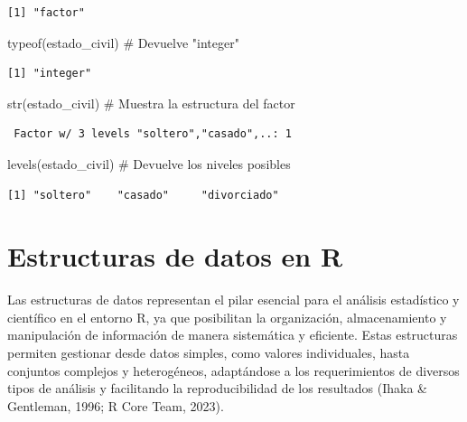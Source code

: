 \documentclass[
  spanish,
  a4paper,
  DIV=11,
  numbers=noendperiod,
  onepage,
  openany]{scrreprt}
\newenvironment{Shaded}{\begin{snugshade}}{\end{snugshade}}
\newcommand{\CommentTok}[1]{\textcolor[rgb]{0.37,0.37,0.37}{#1}}
\newcommand{\FunctionTok}[1]{\textcolor[rgb]{0.28,0.35,0.67}{#1}}
\newcommand{\NormalTok}[1]{\textcolor[rgb]{0.00,0.23,0.31}{#1}}
\begin{document}
\begin{verbatim}
[1] "factor"
\end{verbatim}

\begin{Shaded}
\begin{Highlighting}[]
\FunctionTok{typeof}\NormalTok{(estado\_civil)  }\CommentTok{\# Devuelve "integer"}
\end{Highlighting}
\end{Shaded}

\begin{verbatim}
[1] "integer"
\end{verbatim}

\begin{Shaded}
\begin{Highlighting}[]
\FunctionTok{str}\NormalTok{(estado\_civil)     }\CommentTok{\# Muestra la estructura del factor}
\end{Highlighting}
\end{Shaded}

\begin{verbatim}
 Factor w/ 3 levels "soltero","casado",..: 1
\end{verbatim}

\begin{Shaded}
\begin{Highlighting}[]
\FunctionTok{levels}\NormalTok{(estado\_civil)  }\CommentTok{\# Devuelve los niveles posibles}
\end{Highlighting}
\end{Shaded}

\begin{verbatim}
[1] "soltero"    "casado"     "divorciado"
\end{verbatim}


\chapter{Estructuras de datos en R}\label{estructuras-de-datos-en-r}

Las estructuras de datos representan el pilar esencial para el análisis
estadístico y científico en el entorno R, ya que posibilitan la
organización, almacenamiento y manipulación de información de manera
sistemática y eficiente. Estas estructuras permiten gestionar desde
datos simples, como valores individuales, hasta conjuntos complejos y
heterogéneos, adaptándose a los requerimientos de diversos tipos de
análisis y facilitando la reproducibilidad de los resultados (Ihaka \&
Gentleman, 1996; R Core Team, 2023).
\end{document}
